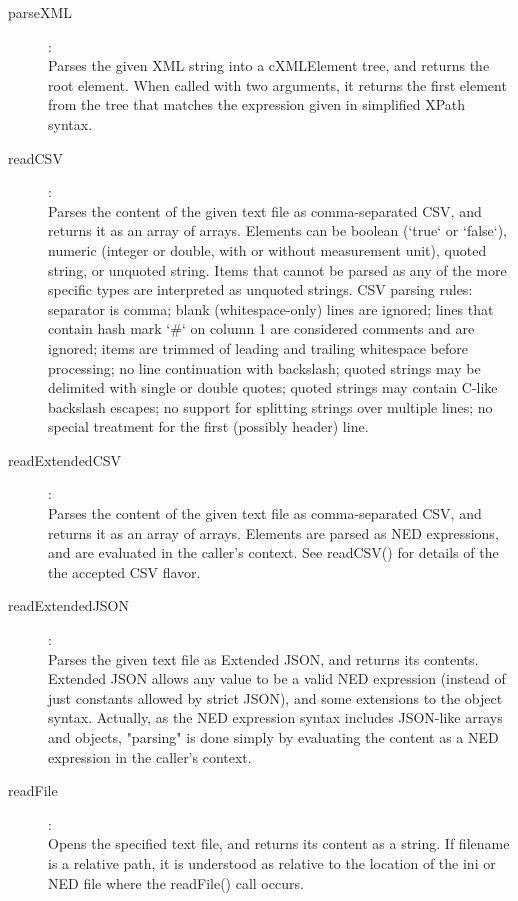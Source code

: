 \begin{description}
\item[parseXML]:  \\
    Parses the given XML string into a cXMLElement tree, and returns the root
    element. When called with two arguments, it returns the first element from
    the tree that matches the expression given in simplified XPath syntax.

\item[readCSV]:  \\
    Parses the content of the given text file as comma-separated CSV, and
    returns it as an array of arrays. Elements can be boolean (`true` or
    `false`), numeric (integer or double, with or without measurement unit),
    quoted string, or unquoted string. Items that cannot be parsed as any of
    the more specific types are interpreted as unquoted strings. CSV parsing
    rules: separator is comma; blank (whitespace-only) lines are ignored; lines
    that contain hash mark `\#` on column 1 are considered comments and are
    ignored; items are trimmed of leading and trailing whitespace before
    processing; no line continuation with backslash; quoted strings may be
    delimited with single or double quotes; quoted strings may contain C-like
    backslash escapes; no support for splitting strings over multiple lines; no
    special treatment for the first (possibly header) line.

\item[readExtendedCSV]:  \\
    Parses the content of the given text file as comma-separated CSV, and
    returns it as an array of arrays. Elements are parsed as NED expressions,
    and are evaluated in the caller's context. See readCSV() for details of the
    the accepted CSV flavor.

\item[readExtendedJSON]:  \\
    Parses the given text file as Extended JSON, and returns its contents.
    Extended JSON allows any value to be a valid NED expression (instead of
    just constants allowed by strict JSON), and some extensions to the object
    syntax. Actually, as the NED expression syntax includes JSON-like arrays
    and objects, "parsing" is done simply by evaluating the content as a NED
    expression in the caller's context.

\item[readFile]:  \\
    Opens the specified text file, and returns its content as a string. If
    filename is a relative path, it is understood as relative to the location
    of the ini or NED file where the readFile() call occurs.


\end{description}
